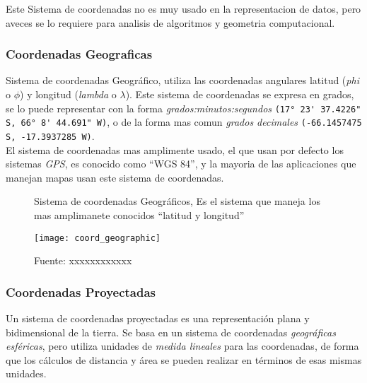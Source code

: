         Este Sistema de coordenadas no es muy usado en la representacion de datos, pero aveces se lo requiere para analisis de algoritmos y geometria computacional.

      \subsubsection{Coordenadas Geograficas} %
      \label{subs:coordenadas_geograficas}
        Sistema de coordenadas Geográfico, utiliza las coordenadas angulares latitud  (\emph{phi} o ${\phi}$) y longitud (\emph{lambda} o ${\lambda}$). Este sistema de coordenadas se expresa en grados, se lo puede representar con la forma \emph{grados:minutos:segundos }\verb|(17° 23' 37.4226" S, 66° 8' 44.691" W)|, o de la forma mas comun \emph{grados decimales} \verb|(-66.1457475 S, -17.3937285 W)|.\\

        El sistema de coordenadas  mas amplimente usado, el que usan por defecto los sistemas \emph{GPS}, es conocido como ``WGS 84'', y la mayoria de las aplicaciones que manejan mapas usan este sistema de coordenadas.\\

        \begin{figure}[H]
          \begin{center}
            \caption[Sistema de coordenadas Geográficos]{Sistema de coordenadas Geográficos, Es el sistema que maneja los mas amplimanete conocidos ``latitud y longitud''}
            \label{fig:coord_geographic}
            \texttt{[image: coord\_geographic]}
            \caption*{Fuente: xxxxxxxxxxxx}
          \end{center}

        \end{figure}


      \subsubsection{Coordenadas Proyectadas} %
      \label{subs:coordenadas_proyectadas}
        Un sistema de coordenadas proyectadas es una representación plana y bidimensional de la  tierra. Se basa en un sistema de coordenadas \emph{geográficas esf\'ericas}, pero utiliza unidades de \emph{medida lineales} para las coordenadas, de forma que los cálculos de distancia y área se pueden realizar en términos de esas mismas unidades.\cite{projected} \\

